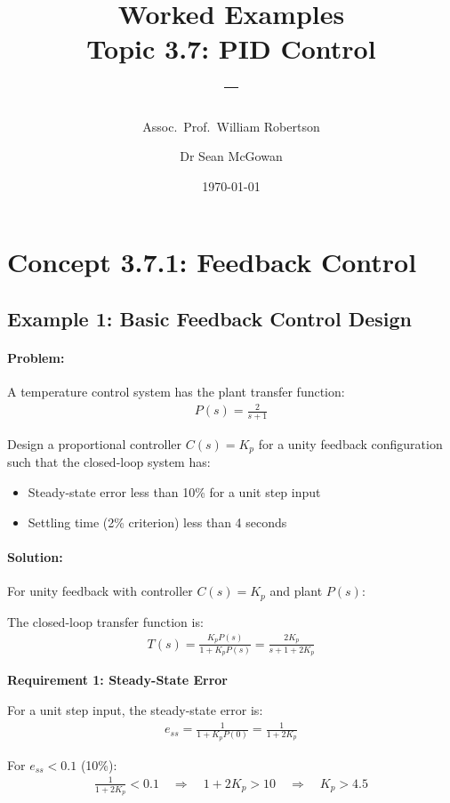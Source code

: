 \documentclass[11pt,a4paper]{article}
\title{\textbf{Worked Examples}\\[0.5em]
\large Topic 3.7: PID Control\\[0.3em]
\normalsize \coursesubtitle{} -- \coursetitle}
\author{Assoc.\ Prof.\ William Robertson \and Dr Sean McGowan}
\date{\today}
\begin{document}
\maketitle
\tableofcontents
\newpage

\section{Concept 3.7.1: Feedback Control}

\subsection{Example 1: Basic Feedback Control Design}

\paragraph{Problem:} A temperature control system has the plant transfer function:
\begin{align}
P(s) = \frac{2}{s+1}
\end{align}

Design a proportional controller $C(s) = K_p$ for a unity feedback configuration such that the closed-loop system has:
\begin{itemize}
\item Steady-state error less than 10\% for a unit step input
\item Settling time (2\% criterion) less than 4 seconds
\end{itemize}

\paragraph{Solution:}

For unity feedback with controller $C(s) = K_p$ and plant $P(s)$:

The closed-loop transfer function is:
\begin{align}
T(s) = \frac{K_pP(s)}{1 + K_pP(s)} = \frac{2K_p}{s + 1 + 2K_p}
\end{align}

\textbf{Requirement 1: Steady-State Error}

For a unit step input, the steady-state error is:
\begin{align}
e_{ss} = \frac{1}{1 + K_pP(0)} = \frac{1}{1 + 2K_p}
\end{align}

For $e_{ss} < 0.1$ (10\%):
\begin{align}
\frac{1}{1 + 2K_p} < 0.1 \quad \Rightarrow \quad 1 + 2K_p > 10 \quad \Rightarrow \quad K_p > 4.5
\end{align}
\end{document}
